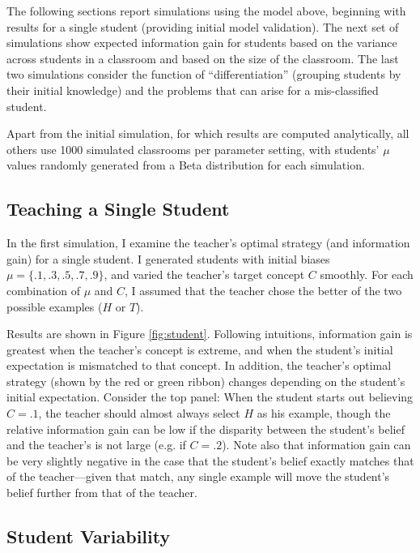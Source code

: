 \documentclass[10pt,letterpaper]{article}
\begin{document}
The following sections report simulations using the model above, beginning with results for a single student (providing initial model validation). The next set of simulations show expected information gain for students based on the variance across students in a classroom and based on the size of the classroom. The last two simulations consider the function of ``differentiation'' (grouping students by their initial knowledge) and the problems that can arise for a mis-classified student. 

Apart from the initial simulation, for which results are computed analytically, all others use 1000 simulated classrooms per parameter setting, with students' $\mu$ values randomly generated from a Beta distribution for each simulation.

\subsection{Teaching a Single Student}



In the first simulation, I examine the teacher's optimal strategy (and information gain) for a single student. I generated students with initial biases $\mu= \{.1, .3, .5, .7, .9\}$, and varied the teacher's target concept $C$ smoothly. For each combination of $\mu$ and $C$, I assumed that the teacher chose the better of the two possible examples ($H$ or $T$). 

Results are shown in Figure \ref{fig:student}. Following intuitions, information gain is greatest when the teacher's concept is extreme, and when the student's initial expectation is mismatched to that concept. In addition, the teacher's optimal strategy (shown by the red or green ribbon) changes depending on the student's initial expectation. Consider the top panel: When the student starts out believing $C=.1$, the teacher should almost always select $H$ as his example, though the relative information gain can be low if the disparity between the student's belief and the teacher's is not large (e.g. if $C=.2$). Note also that information gain can be very slightly negative in the case that the student's belief exactly matches that of the teacher---given that match, any single example will move the student's belief further from that of the teacher. 

\subsection{Student Variability}
\end{document}
